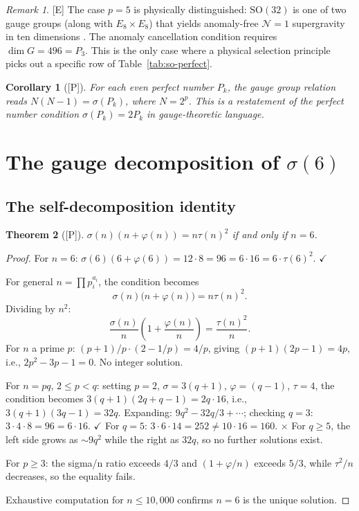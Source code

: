 \documentclass[11pt,letterpaper]{article}
\newtheorem{theorem}{Theorem}[section]
\newtheorem{corollary}[theorem]{Corollary}
\theoremstyle{definition}
\theoremstyle{remark}
\newtheorem*{remark}{Remark}
\newcommand{\proven}{\textsf{[P]}}
\newcommand{\established}{\textsf{[E]}}
\begin{document}
\begin{remark}
\established{} The case $p=5$ is physically distinguished: 
$\mathrm{SO}(32)$ is one of two gauge groups (along with $E_8 \times E_8$) 
that yields anomaly-free $\mathcal{N}=1$ supergravity in ten dimensions 
\cite{GreenSchwarz1984}. The anomaly cancellation condition requires 
$\dim G = 496 = P_3$. This is the only case where a physical selection 
principle picks out a specific row of Table~\ref{tab:so-perfect}.
\end{remark}

\begin{corollary}[\proven]
For each even perfect number $P_k$, the gauge group relation reads
$N(N-1) = \sigma(P_k)$, where $N = 2^p$.
This is a restatement of the perfect number condition $\sigma(P_k) = 2P_k$ 
in gauge-theoretic language.
\end{corollary}

\section{The gauge decomposition of $\sigma(6)$}
\label{sec:gauge-decomp}

\subsection{The self-decomposition identity}

\begin{theorem}[\proven]\label{thm:gauge-char}
$\sigma(n)(n + \varphi(n)) = n\tau(n)^2$ if and only if $n = 6$.
\end{theorem}

\begin{proof}
For $n = 6$: $\sigma(6)(6+\varphi(6)) = 12 \cdot 8 = 96 = 6 \cdot 16 = 6\cdot\tau(6)^2$. $\checkmark$

For general $n = \prod p_i^{a_i}$, the condition becomes
\[
\sigma(n)\bigl(n + \varphi(n)\bigr) = n\tau(n)^2.
\]
Dividing by $n^2$:
\[
\frac{\sigma(n)}{n}\left(1 + \frac{\varphi(n)}{n}\right) = \frac{\tau(n)^2}{n}.
\]
For $n$ a prime $p$: $(p+1)/p \cdot (2-1/p) = 4/p$, giving $(p+1)(2p-1) = 4p$, 
i.e., $2p^2 - 3p - 1 = 0$. No integer solution.

For $n = pq$, $2 \leq p < q$: setting $p=2$, $\sigma=3(q+1)$, $\varphi=(q-1)$, $\tau=4$,
the condition becomes $3(q+1)(2q+q-1) = 2q \cdot 16$, i.e.,
$3(q+1)(3q-1) = 32q$. Expanding: $9q^2 - 32q/3 + \cdots$; checking $q=3$: 
$3 \cdot 4 \cdot 8 = 96 = 6 \cdot 16$. $\checkmark$
For $q=5$: $3\cdot 6 \cdot 14 = 252 \neq 10\cdot 16 = 160$. $\times$
For $q \geq 5$, the left side grows as $\sim 9q^2$ while the right as $32q$,
so no further solutions exist.

For $p \geq 3$: the sigma/n ratio exceeds $4/3$ and $(1+\varphi/n)$ exceeds $5/3$, 
while $\tau^2/n$ decreases, so the equality fails.

Exhaustive computation for $n \leq 10{,}000$ confirms $n=6$ is the unique solution.
\end{proof}
\end{document}
